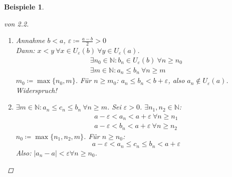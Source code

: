 \documentclass[titlepage,ngerman,a4paper,headsepline,DIV15,halfparskip*,14pt]{scrartcl}
\newcommand{\N}{\mathbb{N}}
\theoremstyle{dotless}
\newtheorem*{beispiele}{Beispiele}
\begin{document}
\begin{beispiele}
\begin{proof}[von 2.2]
\begin{enumerate}
\begin{enumerate}
					$$
						c_{n} \leq c(|b_{n}-b| + |a_{n}-a|) \eqqcolon \alpha_{n} \xRightarrow[c) (ii), c) (iii)]{a)} \alpha_{n} \rightarrow 0
					$$
					Also: $|c_{n} - 0| = c_{n} \leq \alpha_{n} ~\forall n \in \N$ und $\alpha_{n} \rightarrow 0 \xRightarrow[]{b)} c_{n} \rightarrow 0$.
				\item $\varepsilon \coloneqq \frac{|a|}{2}$; aus (i): $|a_{n}| \rightarrow |a| \Rightarrow \exists n \in N$:
					$$
						 |a_{n}| \in U_{\varepsilon}(|a|) = (|a| - \varepsilon, |a| + \varepsilon) = (\frac{|a|}{2}, \frac{3}{2} |a|) \quad \forall n \geq m
					$$
					$\Rightarrow |a_{n}| > \frac{|a|}{2} > 0 ~\forall n \geq m \Rightarrow a_{n} \neq 0 ~\forall n \geq m$. \\
					Für $n \geq m$:
					$$
						\left| \frac{1}{a_{n}} - \frac{1}{a} \right| = \frac{|a_{n} - a|}{|a_{n}||a|} \leq \frac{2|a_{n} - a|}{|a|^{2}} \eqqcolon \alpha_{n}
					$$
					$\alpha_{n} \rightarrow 0 \xRightarrow[]{b)} \frac{1}{a_{n}} \rightarrow \frac{1}{a}$.
			  \end{enumerate}
			\item Annahme $b < a$, $\varepsilon \coloneqq \frac{a-b}{2} > 0$ ~  \\
				Dann: $x < y ~\forall x \in U_{\varepsilon}(b) ~\forall y \in U_{\varepsilon}(a)$. \\
				\begin{align*}
				\exists n_{0} \in \N: b_{n} \in U_{\varepsilon}(b) ~\forall n \geq n_{0} \\
				\exists m \in \N: a_{n} \leq b_{n} ~\forall n \geq m
				\end{align*} 
				$m_{0} \coloneqq \max \{ n_{0}, m \}$. Für $n \geq m_{0}$: $a_{n} \leq b_{n} < b + \varepsilon$, also $a_{n} \notin U_{\varepsilon}(a)$. Widerspruch!   
			\item $\exists m \in \N: a_{n} \leq c_{n} \leq b_{n} ~\forall n \geq m$. Sei $\varepsilon > 0$. $\exists n_{1}, n_{2} \in \N$: 
				\begin{align*}
					a - \varepsilon < a_{n} < a + \varepsilon ~\forall n \geq n_{1} \\
					a - \varepsilon < b_{n} < a + \varepsilon ~\forall n \geq n_{2}
				\end{align*}
				$n_{0} \coloneqq \max \{ n_{1}, n_{2}, m \}$. Für $n \geq n_{0}$:
				$$
					a - \varepsilon < a_{n} \leq c_{n} \leq b_{n} < a + \varepsilon
				$$
				Also: $|a_{n} - a| < \varepsilon \forall n \geq n_{0}$.
		\end{enumerate}	
	\end{proof}	
\end{beispiele}
\end{document}
